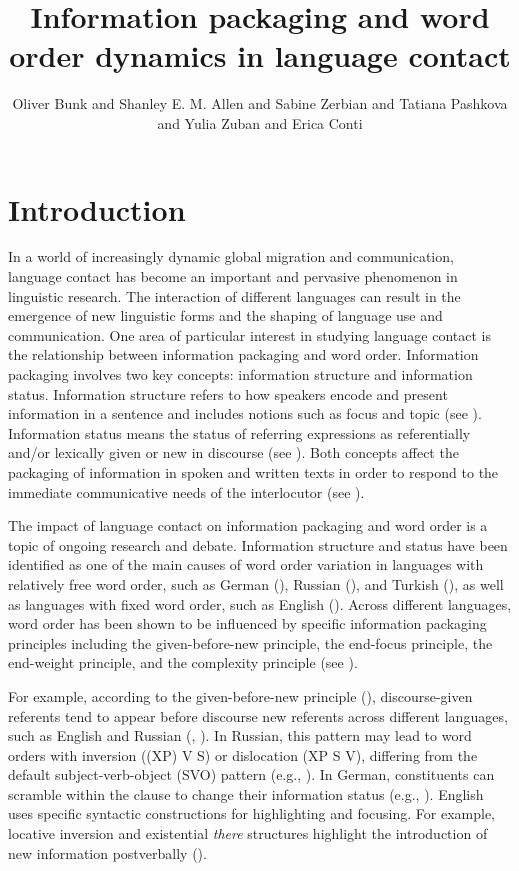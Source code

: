 \documentclass[output=paper,colorlinks,citecolor=brown]{langscibook}
\title{Information packaging and word order dynamics in language contact}
\author{Oliver Bunk\orcid{0000-0003-4505-4873}\affiliation{Humboldt-Universität zu Berlin} and Shanley E. M. Allen\orcid{0000-0002-5421-6750}\affiliation{University of Kaiserslautern-Landau} and  Sabine Zerbian\orcid{0000-0002-4631-369X}\affiliation{University of Stuttgart} and Tatiana Pashkova\orcid{0000-0002-6676-9555}\affiliation{University of Kaiserslautern-Landau} and Yulia Zuban\orcid{0009-0009-3033-1760}\affiliation{University of Stuttgart} and Erica Conti\orcid{}\affiliation{Humboldt-Universität zu Berlin}}
\begin{document}
\maketitle

\section{Introduction} 
In a world of increasingly dynamic global migration and communication, language contact has become an important and pervasive phenomenon in linguistic research. The interaction of different languages can result in the emergence of new linguistic forms and the shaping of language use and communication. One area of particular interest in studying language contact is the relationship between information packaging and word order. Information packaging involves two key concepts: information structure and information status. Information structure refers to how speakers encode and present information in a sentence and includes notions such as focus and topic (see \cite{krifka_information_2012}). Information status means the status of referring expressions as referentially and/or lexically given or new in discourse (see \cite{BaumannStefan2006Tiog}). Both concepts affect the packaging of information in spoken and written texts in order to respond to the immediate communicative needs of the interlocutor (see \cite{chafe_1976}).

The impact of language contact on information packaging and word order is a topic of ongoing research and debate. Information structure and status have been identified as one of the main causes of word order variation in languages with relatively free word order, such as German (\cite{musan_informationsstrukturelle_2002}), Russian (\cite{jasinskaja_information_2016}), and Turkish (\cite{ozsoy_word_2019}), as well as languages with fixed word order, such as English (\cite{ward_information_2004}). Across different languages, word order has been shown to be influenced by specific information packaging principles including the given-before-new principle, the end-focus principle, the end-weight principle, and the complexity principle (see \cite{hilpert_information_2021}).

For example, according to the given-before-new principle (\citealt{halliday1967notes, hilpert_information_2021}), discourse-given referents tend to appear before discourse new referents across different languages, such as English and Russian (\cite{haviland_whats_1974, kathryn_bock_syntactic_1980, arnold_heaviness_2000, slioussar_grammar_2007}, \citeyear{slioussar_processing_2011}). In Russian, this pattern may lead to word orders with inversion ((XP) V S) or dislocation (XP S V), differing from the default subject-verb-object (SVO) pattern (e.g., \cite{king_configuring_1995, kallestinova_aspects_2007, bailyn_syntax_2012}). In German, constituents can scramble within the clause to change their information status (e.g., \cite{musan_informationsstrukturelle_2002}). English uses specific syntactic constructions for highlighting and focusing. For example, locative inversion and existential \textit{there} structures highlight the introduction of new information postverbally (\cite{ward_information_2004}).
\end{document}

